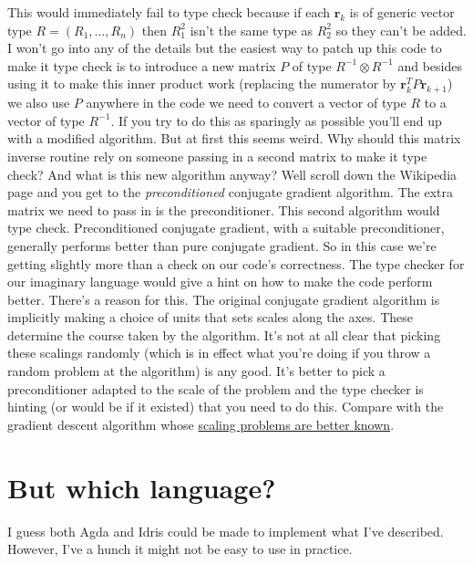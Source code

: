 \documentclass[12pt]{article}
\begin{document}
This would immediately fail to type check because if each $\mathbf{r}_k$ is of generic vector type $R=(R_1,\ldots,R_n)$ then $R_1^2$ isn't the same type as $R_2^2$ so they can't be added.
I won't go into any of the details but the easiest way to patch up this code to make it type check is to introduce a new matrix $P$ of type $R^{-1}\otimes R^{-1}$ and besides using it to make this inner product work (replacing the numerator by $\mathbf{r}_k^T P\mathbf{r}_{k+1}$) we also use $P$ anywhere in the code we need to convert a vector of type $R$ to a vector of type $R^{-1}$.
If you try to do this as sparingly as possible you'll end up with a modified algorithm.
But at first this seems weird.
Why should this matrix inverse routine rely on someone passing in a second matrix to make it type check?
And what is this new algorithm anyway?
Well scroll down the Wikipedia page and you get to the {\it preconditioned} conjugate gradient algorithm.
The extra matrix we need to pass in is the preconditioner.
This second algorithm would type check.
Preconditioned conjugate gradient, with a suitable preconditioner, generally performs better than pure conjugate gradient.
So in this case we're getting slightly more than a check on our code's correctness.
The type checker for our imaginary language would give a hint on how to make the code perform better.
There's a reason for this.
The original conjugate gradient algorithm is implicitly making a choice of units that sets scales along the axes.
These determine the course taken by the algorithm.
It's not at all clear that picking these scalings randomly (which is in effect what you're doing if you throw a random problem at the algorithm) is any good.
It's better to pick a preconditioner adapted to the scale of the problem and the type checker is hinting (or would be if it existed) that you need to do this.
Compare with the gradient descent algorithm whose \href{http://www.machinedlearnings.com/2011/06/dimensional-analysis-and-gradient.html}{scaling problems are better known}.

\section{But which language?}
I guess both Agda and Idris could be made to implement what I've described.
However, I've a hunch it might not be easy to use in practice.
\end{document}
